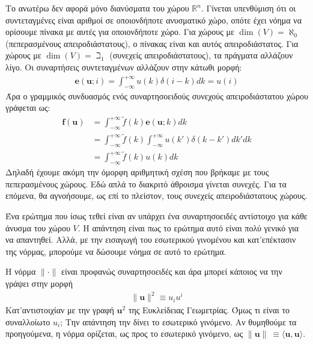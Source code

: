 \documentclass[main.tex]{subfiles}
\begin{document}
	Το ανωτέρω δεν αφορά μόνο διανύσματα του χώρου $\mathbb{R}^n$. Γίνεται υπενθύμιση ότι οι συντεταγμένες είναι αριθμοί σε οποιονδήποτε ανυσματικό χώρο, οπότε έχει νόημα να ορίσουμε πίνακα με αυτές για οποιονδήποτε χώρο. Για χώρους με ${\dim(V) = \aleph_0}$ (πεπερασμένους απειροδιάστατους), ο πίνακας είναι και αυτός απειροδιάστατος. Για χώρους με ${\dim(V) = \beth_1}$ (συνεχείς απειροδιάστατους), τα πράγματα αλλάζουν λίγο. Οι συναρτήσεις συντεταγμένων αλλάζουν στην κάτωθι μορφή:
	\begin{align*}
		\boldsymbol{e}(\boldsymbol{u};i) = \int^{+\infty}_{-\infty}u(k)\delta(i - k)dk = u(i)
	\end{align*}
	Άρα ο γραμμικός συνδυασμός ενός συναρτησοειδούς συνεχούς απειροδιάστατου χώρου γράφεται ως:
	\begin{align*}
		\boldsymbol{f}(\boldsymbol{u}) &= \int^{+\infty}_{-\infty}\tilde{f}(k)\boldsymbol{e}(\boldsymbol{u};k)dk \\
		&= \int^{+\infty}_{-\infty}\tilde{f}(k)\int^{+\infty}_{-\infty}u(k')\delta(k - k')dk'dk \\
		&= \int^{+\infty}_{-\infty}\tilde{f}(k)u(k)dk
	\end{align*}
	Δηλαδή έχουμε ακόμη την όμορφη αριθμητική σχέση που βρήκαμε με τους πεπερασμένους χώρους. Εδώ απλά το διακριτό άθροισμα γίνεται συνεχές. Για τα επόμενα, θα αγνοήσουμε, ως επί το πλείστον, τους συνεχείς απειροδιάστατους χώρους.
	
	Ένα ερώτημα που ίσως τεθεί είναι αν υπάρχει ένα συναρτησοειδές αντίστοιχο για κάθε άνυσμα του χώρου $V$. Η απάντηση είναι πως το ερώτημα αυτό είναι πολύ γενικό για να απαντηθεί. Αλλά, με την εισαγωγή του εσωτερικού γινομένου και κατ'επέκτασιν της νόρμας, μπορούμε να δώσουμε νόημα σε αυτό το ερώτημα.
	
	Η νόρμα $\|\cdot\|$ είναι προφανώς συναρτησοειδές και άρα μπορεί κάποιος να την γράψει στην μορφή
	\begin{align*}
		\|\boldsymbol{u}\|^2 \equiv u_iu^i
	\end{align*}
	Κατ'αντιστοιχίαν με την γραφή $\boldsymbol{u}^2$ της Ευκλείδειας Γεωμετρίας. Όμως τι είναι το συναλλοίωτο $u_i$; Την απάντηση την δίνει το εσωτερικό γινόμενο. Αν θυμηθούμε τα προηγούμενα, η νόρμα ορίζεται, ως προς το εσωτερικό γινόμενο, ως ${\|\boldsymbol{u}\|\ \equiv \langle\boldsymbol{u},\boldsymbol{u}\rangle}$.
	
\end{document}
